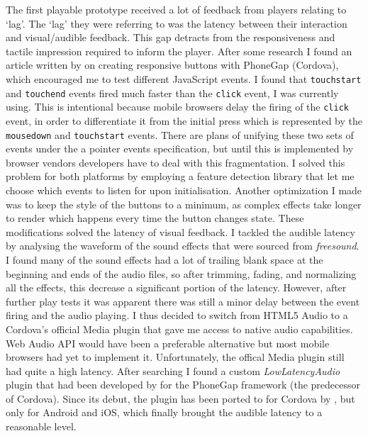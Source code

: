 \documentclass[final]{cmpreport}
\begin{document}
The first playable prototype received a lot of feedback from players relating to `lag'. The `lag' they were referring to was the latency between their interaction and visual/audible feedback. This gap detracts from the responsiveness and tactile impression required to inform the player. After some research I found an article written by \citet{Croft} on creating responsive buttons with PhoneGap (Cordova), which encouraged me to test different JavaScript events. I found that \texttt{touchstart} and \texttt{touchend} events fired much faster than the \texttt{click} event, I was currently using. This is intentional because mobile browsers delay the firing of the \texttt{click} event, in order to differentiate it from the initial press which is represented by the \texttt{mousedown} and \texttt{touchstart} events. There are plans of unifying these two sets of events under the a pointer events specification, but until this is implemented by browser vendors developers have to deal with this fragmentation. I solved this problem for both platforms by employing a feature detection library that let me choose which events to listen for upon initialisation. Another optimization I made was to keep the style of the buttons to a minimum, as complex effects take longer to render which happens every time the button changes state. These modifications solved the latency of visual feedback. I tackled the audible latency by analysing the waveform of the sound effects that were sourced from \textit{freesound}. I found many of the sound effects had a lot of trailing blank space at the beginning and ends of the audio files, so after trimming, fading, and normalizing all the effects, this decrease a significant portion of the latency. However, after further play tests it was apparent there was still a minor delay between the event firing and the audio playing. I thus decided to switch from HTML5 Audio to a Cordova's official Media plugin that gave me access to native audio capabilities. Web Audio API would have been a preferable alternative but most mobile browsers had yet to implement it. Unfortunately, the offical Media plugin still had quite a high latency. After searching I found a custom \textit{LowLatencyAudio} plugin that had been developed by \citet{Trice} for the PhoneGap framework (the predecessor of Cordova). Since its debut, the plugin has been ported to for Cordova by \citet{Xie}, but only for Android and iOS, which finally brought the audible latency to a reasonable level.
\end{document}
